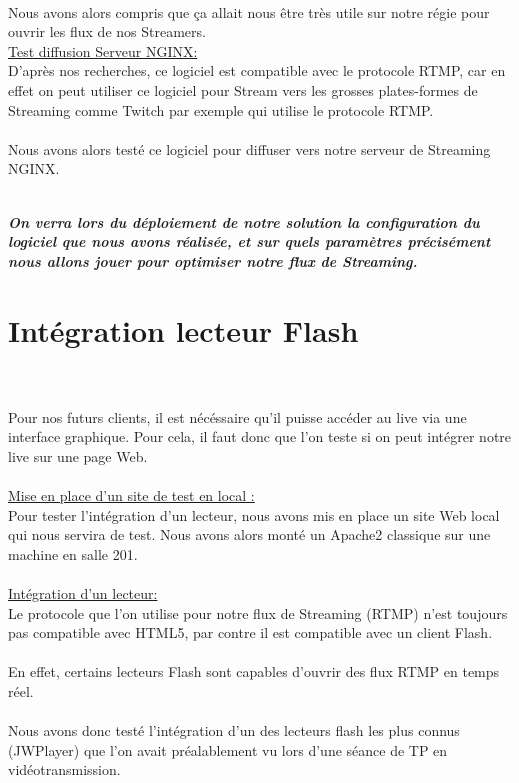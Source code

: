 \documentclass{report}
\begin{document}
    \hfill
    \\
    Nous avons alors compris que ça allait nous être très utile sur notre régie pour ouvrir les flux de nos Streamers.\\
    
    
    \underline{Test diffusion Serveur NGINX:}\\
    
    D’après nos recherches, ce logiciel est compatible avec le protocole RTMP, car en effet on peut utiliser ce logiciel pour Stream vers les grosses plates-formes de Streaming comme Twitch par exemple qui utilise le protocole RTMP.
    \\
    \\
    Nous avons alors testé ce logiciel pour diffuser vers notre serveur de Streaming NGINX.
    \\
    \\
    \begin{center}
    \textbf{\textit{On verra lors du déploiement de notre solution la configuration du logiciel que nous avons réalisée, et sur quels paramètres précisément nous allons jouer pour optimiser notre flux de Streaming.}}
    \end{center}
    

    \section{Intégration lecteur Flash}  
    \\
    \\
    Pour nos futurs clients, il est nécéssaire qu’il puisse accéder au live via une interface graphique. Pour cela, il faut donc que l’on teste si on peut intégrer notre live sur une page Web.
    \\
    \\
    \underline{Mise en place d’un site de test en local :}\\
    
    Pour tester l’intégration d’un lecteur, nous avons mis en place un site Web local qui nous servira de test. Nous avons alors monté un Apache2 classique sur une machine en salle 201.
    \\
    \\
    \underline{Intégration d’un lecteur:}\\
    
    Le protocole que l’on utilise pour notre flux de Streaming (RTMP) n’est toujours pas compatible avec HTML5, par contre il est compatible avec un client Flash.
    \\
    \\
    En effet, certains lecteurs Flash sont capables d’ouvrir des flux RTMP en temps réel.
    \\
    \\
    Nous avons donc testé l’intégration d’un des lecteurs flash les plus connus (JWPlayer) que l’on avait préalablement vu lors d’une séance de TP en vidéotransmission.
    \\
    \hfill{\\\\}
    
\end{document}
